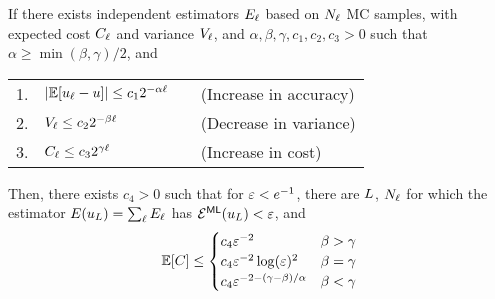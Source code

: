 \begin{frame}{\name{}}
    \begin{theorem}[]
        \small
        If there exists independent estimators $E_\ell$ based on $N_\ell$ MC samples, with expected cost $C_\ell$ and variance $V_\ell$, and $\alpha, \beta, \gamma, c_1, c_2, c_3 > 0$ such that $\alpha \geq \min(\beta, \gamma)/2$, and
        \begin{center}
            \begin{tabular}{rlcl}
                1. & $|\mathbb{E}[u_\ell - u]| \leq c_1 2^{-\alpha\ell}$ & & (Increase in accuracy) \\
                2. & $V_\ell \leq c_2 2^{-\beta \ell}$ & & (Decrease in variance) \\
                3. & $C_\ell \leq c_3 2^{\gamma \ell}$ & & (Increase in cost)
            \end{tabular}
        \end{center}
        Then, there exists $c_4>0$ such that for $\varepsilon < e^{-1}$, there are $L$, $N_\ell$ for which the estimator $E(u_L) = \sum_\ell E_\ell$ has $\mathcal{E}^{\mathsf{ML}}(u_L) < \varepsilon$, and
        \begin{align*}
            \mathbb{E}[C] \leq
            \begin{cases}
                c_4 \varepsilon^{-2} & \beta > \gamma \\
                c_4 \varepsilon^{-2}\log(\varepsilon)^2 & \beta = \gamma \\
                c_4 \varepsilon^{-2 - (\gamma - \beta)/\alpha} & \beta < \gamma \\
            \end{cases}
        \end{align*}
    \end{theorem}
\end{frame}